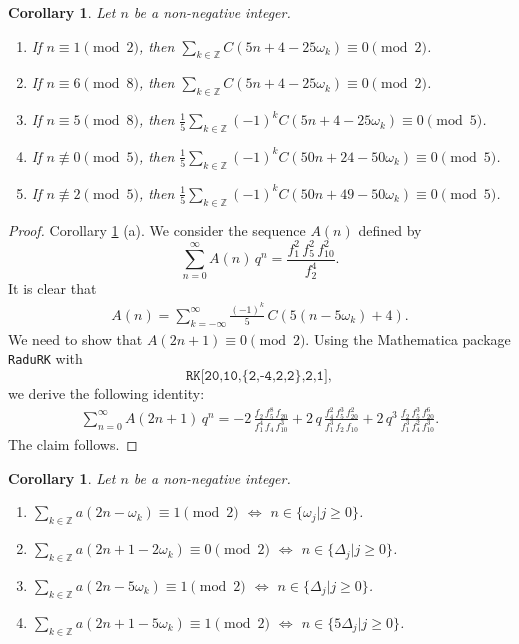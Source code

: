 \documentclass{article}
\newtheorem{corollary}[theorem]{Corollary}
\begin{document}
\begin{corollary} \label{Cor2} Let $n$ be a non-negative integer.
\begin{enumerate}
    \item [(a)] If $n\equiv 1 \pmod 2$, then  $\sum\limits_{k\in\mathbb{Z}}C(5n+4-25\omega_k)\equiv 0 \pmod 2$.
    \item [(b)] If $n\equiv 6 \pmod 8$, then  $\sum\limits_{k\in\mathbb{Z}}C(5n+4-25\omega_k) \equiv 0 \pmod 2$.
    \item [(c)] If $n\equiv 5 \pmod 8$, then  $\frac15\sum\limits_{k\in\mathbb{Z}}(-1)^k C(5n+4-25\omega_k)\equiv 0 \pmod 5$.
    \item [(d)] If $n\not\equiv 0 \pmod 5$, then  $\frac15\sum\limits_{k\in\mathbb{Z}} (-1)^k C(50n+24-50\omega_k) \equiv 0 \pmod 5$.
    \item [(e)] If $n\not\equiv 2 \pmod 5$, then  $\frac15\sum\limits_{k\in\mathbb{Z}} (-1)^k C(50n+49-50\omega_k) \equiv 0 \pmod 5$.
\end{enumerate}
\end{corollary}
\medskip

\begin{proof}
Corollary \ref{Cor2} (a). We consider the sequence $A(n)$ defined by
$$
\sum_{n=0}^\infty A(n)\,q^n = \frac{f_1^2\,f_5^2\,f_{10}^2}{f_2^4}.
$$ 
It is clear that
\begin{align}
A(n)=\sum_{k=-\infty}^\infty \frac{(-1)^k}{5}\,C\left(5(n-5\omega_k)+4\right).
\end{align}
We need to show that $A(2n+1)\equiv 0 \pmod 2.$
Using the Mathematica package \texttt{RaduRK} with
$$\texttt{RK[20,10,\{2,-4,2,2\},2,1]},$$
we derive the following identity:
\begin{align*}
\sum_{n=0}^\infty A(2n+1)\,q^n
=-2\,\frac{f_2\,f_5^8\,f_{20}}{f_1^4\,f_4\,f_{10}^3}
+2\,q\,\frac{f_4^2\,f_5^3\,f_{20}^2}{f_1^3\,f_2\,f_{10}}
+2\,q^3\,\frac{f_2\,f_5^3\,f_{20}^6}{f_1^3\,f_4^2\,f_{10}^3}.
\end{align*}
The claim follows.
\end{proof}


	
\medskip

\begin{corollary} \label{Cor3} Let $n$ be a non-negative integer.
\begin{enumerate}
    \item[(a)] $\sum\limits_{k\in\mathbb{Z}}a(2n-\omega_k)\equiv 1 \pmod 2$   $\iff$ $n\in\{\omega_j\vert j\geq0\}$.
    \item[(b)] $\sum\limits_{k\in\mathbb{Z}}a(2n+1-2\omega_k)\equiv 0 \pmod 2$   $\iff$  $n\in\{\Delta_j\vert j\geq0\}$.
    \item[(c)] $\sum\limits_{k\in\mathbb{Z}}a(2n-5\omega_k)\equiv 1 \pmod 2$   $\iff$   $n\in\{\Delta_j\vert j\geq0\}$.
    \item[(d)] $\sum\limits_{k\in\mathbb{Z}}a(2n+1-5\omega_k)\equiv 1 \pmod 2$    $\iff$   $n\in\{5\Delta_j\vert j\geq0\}$.
\end{enumerate}
\end{corollary}
\end{document}
